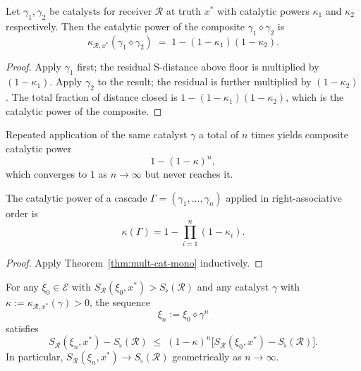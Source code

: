 \begin{theorem}
\label{thm:mult-cat-mono}
Let $\gamma_1, \gamma_2$ be catalysts for receiver $\mathcal{R}$ at truth
$x^{*}$ with catalytic powers $\kappa_1$ and $\kappa_2$ respectively.
Then the catalytic power of the composite $\gamma_1 \diamond \gamma_2$ is
\[
  \kappa_{\mathcal{R}, x^{*}}(\gamma_1 \diamond \gamma_2)
  \;=\; 1 - (1 - \kappa_1)(1 - \kappa_2).
\]
\end{theorem}

\begin{proof}
Apply $\gamma_1$ first; the residual S-distance above floor is multiplied by
$(1 - \kappa_1)$.  Apply $\gamma_2$ to the result; the residual is further
multiplied by $(1 - \kappa_2)$.  The total fraction of distance closed is
$1 - (1 - \kappa_1)(1 - \kappa_2)$, which is the catalytic power of the
composite.
\end{proof}

\begin{corollary}\label{cor:diminishing-mono}
Repeated application of the same catalyst $\gamma$ a total of $n$ times yields
composite catalytic power
\[
  1 - (1 - \kappa)^n,
\]
which converges to $1$ as $n \to \infty$ but never reaches it.
\end{corollary}

\begin{corollary}\label{cor:cascade-mono}
The catalytic power of a cascade $\Gamma = (\gamma_1, \ldots, \gamma_n)$
applied in right-associative order is
\[
  \kappa(\Gamma) = 1 - \prod_{i=1}^{n}(1 - \kappa_i).
\]
\end{corollary}

\begin{proof}
Apply Theorem~\ref{thm:mult-cat-mono} inductively.
\end{proof}

\begin{theorem}\label{thm:cat-conv-mono}
For any $\xi_0 \in \mathcal{E}$ with
$S_{\mathcal{R}}(\xi_0, x^{*}) > S_{\flat}(\mathcal{R})$ and any catalyst
$\gamma$ with $\kappa := \kappa_{\mathcal{R}, x^{*}}(\gamma) > 0$, the
sequence
\[
  \xi_n := \xi_0 \diamond \gamma^n
\]
satisfies
\[
  S_{\mathcal{R}}(\xi_n, x^{*}) - S_{\flat}(\mathcal{R})
  \;\leq\; (1-\kappa)^n
  \bigl[S_{\mathcal{R}}(\xi_0, x^{*}) - S_{\flat}(\mathcal{R})\bigr].
\]
In particular, $S_{\mathcal{R}}(\xi_n, x^{*}) \to S_{\flat}(\mathcal{R})$
geometrically as $n \to \infty$.
\end{theorem}

